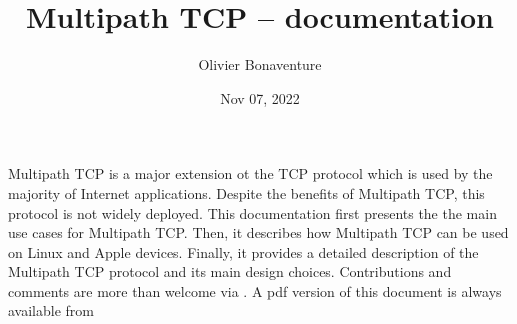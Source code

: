 \documentclass[letterpaper,10pt,english]{sphinxmanual}
\title{Multipath TCP -- documentation}
\date{Nov 07, 2022}
\author{Olivier Bonaventure}
\begin{document}
\pagestyle{empty}
\sphinxmaketitle
\pagestyle{plain}
\sphinxtableofcontents
\pagestyle{normal}
\label{\detokenize{index::doc}}


\sphinxAtStartPar
Multipath TCP is a major extension ot the TCP protocol which is used by the majority of Internet applications. Despite the benefits of Multipath TCP, this protocol is not widely deployed. This documentation first presents the the main use cases for Multipath TCP. Then, it describes how Multipath TCP can be used on Linux and Apple devices. Finally, it provides a detailed description of the Multipath TCP protocol and its main design choices. Contributions and comments are more than welcome via . A pdf version of this document is always available from 
\end{document}
